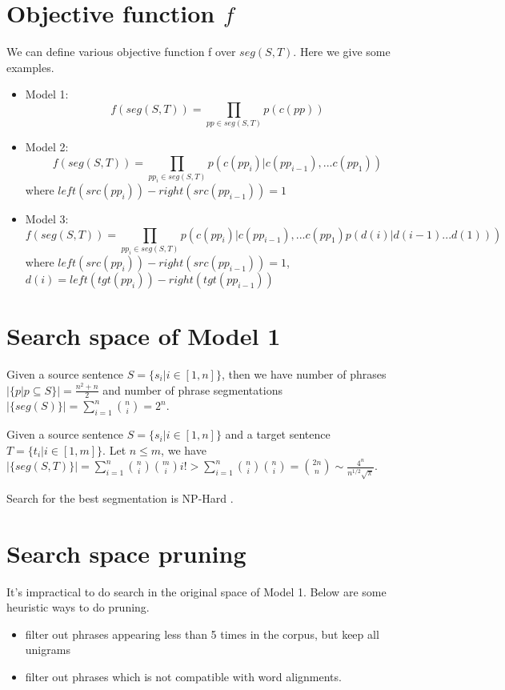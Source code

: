 \documentclass[11pt, oneside]{article}   	%
\begin{document}
\section{Objective function $f$} 
We can define various objective function f over $seg(S,T)$. Here we give some examples.
\begin{itemize}

\item Model 1:
\begin{equation} \label{eq:obj1}
f(seg(S,T))=\prod_{pp \in seg(S,T)}p(c(pp))
\end{equation}

\item Model 2:
\begin{equation} \label{eq:obj2}
f(seg(S,T))=\prod_{pp_i \in seg(S,T)}p(c(pp_i) | c(pp_{i-1}), ... c(pp_1))
\end{equation}
where $left(src(pp_i))- right(src(pp_{i-1}))=1$

\item Model 3:
\begin{equation} \label{eq:obj3}
f(seg(S,T))=\prod_{pp_i \in seg(S,T)} p(c(pp_i) | c(pp_{i-1}), ... c(pp_1) p(d(i) | d(i-1) ... d(1)) )
\end{equation}
where $left(src(pp_i))- right(src(pp_{i-1}))=1$, \quad $d(i)=left(tgt(pp_i))- right(tgt(pp_{i-1}))$
\end{itemize}
\section{Search space of Model 1}
Given a source sentence $S=\{s_i | i \in [1,n]\}$, then we have number of phrases $|\{ p | p \subseteq S \}|=\frac{n^2+n}{2}$ and number of phrase segmentations $|\{seg(S)\}|=\sum\limits_{i=1}^n {n \choose i} = 2^n$. 

Given a source sentence $S=\{s_i | i \in [1,n]\}$ and a target sentence $T=\{t_i | i \in [1,m]\}$.  Let $n \leqslant m $, we have $|\{seg(S,T)\}|= \sum \limits_{i=1}^n {n \choose i}{m \choose i}i!  > \sum \limits_{i=1}^n {n \choose i}{n \choose i} = {2n \choose n} \sim \frac{4^n}{n^{1/2} \sqrt{\pi}}$.

Search for the best segmentation is NP-Hard \cite{denero-acl-08}.


\section{Search space pruning}
It's impractical to do search in the original space of Model 1. Below are some heuristic ways to do pruning.
\begin{itemize}
\item filter out phrases appearing less than 5 times in the corpus, but keep all unigrams \cite{marcu-wong-02}
\item filter out phrases which is not compatible with word alignments. \cite{denero-06-wmt}
\end{itemize}

{}

\end{document}
